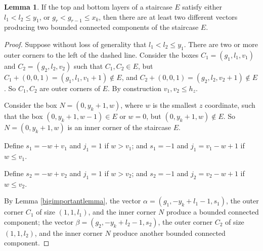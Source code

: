 \documentclass{amsart}[10pt]
\theoremstyle{plain}
\theoremstyle{definition}
\newtheorem{lemma}[theorem]{Lemma}
\begin{document}
\begin{lemma}
\label{sidecomp}
If the top and bottom layers of a staircase $E$ satisfy either $l_1< l_2 \leq y_1$, or $g_r < g_{r-1} \leq x_k$, %
then there are at least two different vectors producing two bounded connected components of the staircase $E$.
\end{lemma}

\begin{proof}
Suppose without loss of generality that $l_1< l_2 \leq y_1$. There are two or more outer corners to the left of the dashed line. Consider the boxes $C_1=(g_1, l_1, v_1)$ and $C_2=(g_2, l_2, v_2)$ such that $C_1, C_2 \in E$, but $C_1+(0,0,1)=(g_1, l_1, v_1+1) \notin E$, and $C_2+(0,0,1)=(g_2, l_2, v_2+1) \notin E$. So $C_1, C_2$ are outer corners of $E$. By construction $v_1, v_2 \leq h_z$.


Consider the box $N=(0,y_k+1,w)$, where $w$ is the smallest $z$ coordinate, such that the box $(0,y_k+1,w-1) \in E$ or $w=0$, but $(0,y_k+1,w) \notin E$. So $N=(0,y_k+1,w)$ is an inner corner of the staircase $E$. 

Define $s_1=-w+v_1$ and $j_1=1$ if $w>v_1$; and $s_1=-1$ and $j_1=v_1-w+1$ if $w \leq v_1$. 

Define $s_2=-w+v_2$ and $j_1=1$ if $w>v_2$; and $s_2=-1$ and $j_2=v_2-w+1$ if $w \leq v_2$. 

By Lemma \ref{bigimportantlemma}, the vector $\alpha=(g_1, -y_k+l_1-1, s_1)$, the outer corner $C_1$ of size $(1,1,l_1)$, and the inner corner $N$ produce a bounded connected component; the vector $\beta=(g_2, -y_k+l_2-1, s_2)$, the outer corner $C_2$ of size $(1,1,l_2)$, and the inner corner $N$ produce another bounded connected component. 

\end{proof}
\end{document}
